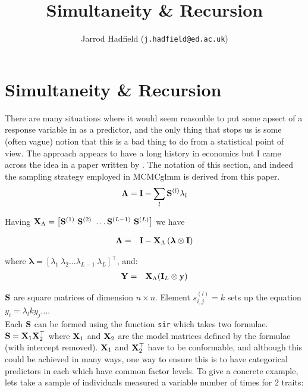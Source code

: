 \documentclass{article}
\title{Simultaneity \& Recursion}
\author{Jarrod Hadfield (\texttt{j.hadfield@ed.ac.uk})}
\begin{document}
\maketitle
\else
\chapter{Simultaneity \& Recursion}
\label{SandR}
\fi

There are many situations where it would seem reasonble to put some apsect of a response variable in as a predictor, and the only thing that stops us is some (often vague) notion that this is a bad thing to do from a statistical point of view. The approach appears to have a long history in economics but I came across the idea in a paper written by  \citet{Gianola.2004}. The notation of this section, and indeed the sampling strategy employed in MCMCglmm is derived from this paper.\\



\begin{equation}
{\bm \Lambda} = {\bf I} - \sum_{l}{\bf S}^{(l)}{\lambda_{l}}
\end{equation}

Having ${\bf X}_{\Lambda} = \left[{\bf S}^{(1)}\ {\bf S}^{(2)}\ \dots {\bf S}^{(L-1)}\ {\bf S}^{(L)}\right]$ we have 

\begin{equation}
\begin{array}{rl}
{\bm \Lambda} =& {\bf I}-{\bf X}_{\Lambda}\left({\bm \lambda} \otimes {\bf I} \right)\\
\end{array}
\label{rs-Eq}
\end{equation}

where ${\bm \lambda} = \left[\lambda_{1}\ \lambda_{2} \dots \lambda_{L-1}\ \lambda_{L} \right]^{\top}$, and:\\

\begin{equation}
\begin{array}{rl}
{\bf Y} =&  {\bf X}_{\Lambda}({\bf I}_{L} \otimes {\bf y})\\
\end{array}
\end{equation}


${\bf S}$ are square matrices of dimension $n \times n$. Element $s_{i,j}^{(l)}=k$ sets up the equation $y_{i} = \lambda_{l}ky_{j} \dots$.\\

Each ${\bf S}$ can be formed using the function \texttt{sir} which takes two formulae. ${\bf S} = {\bf X}_{1}{\bf X}_{2}^{\top}$ where ${\bf X}_{1}$ and ${\bf X}_{2}$ are the model matrices defined by the formulae (with intercept removed).  ${\bf X}_{1}$ and ${\bf X}_{2}^{\top}$ have to be conformable, and although this could be achieved in many ways, one way to ensure this is to have categorical predictors in each which have common factor levels.  To give a concrete example, lets take a sample of individuals measured a variable number of times for 2 traits: 
\end{document}
